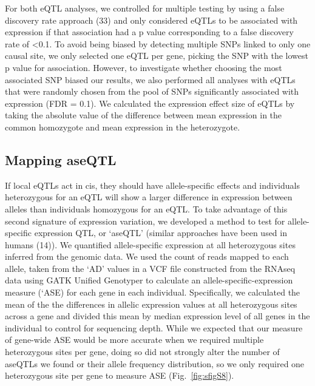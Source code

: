 For both eQTL analyses, we controlled for multiple testing by using a false discovery rate approach (33) and only considered eQTLs to be associated with expression if that association had a p value corresponding to a false discovery rate of <0.1. To avoid being biased by detecting multiple SNPs linked to only one causal site, we only selected one eQTL per gene, picking the SNP with the lowest p value for association. However, to investigate whether choosing the most associated SNP biased our results, we also performed all analyses with eQTLs that were randomly chosen from the pool of SNPs significantly associated with expression (FDR = 0.1). We calculated the expression effect size of eQTLs by taking the absolute value of the difference between mean expression in the common homozygote and mean expression in the heterozygote. 

\subsection{Mapping aseQTL}
If local eQTLs act in cis, they should have allele-specific effects and individuals heterozygous for an eQTL will show a larger difference in expression between alleles than individuals homozygous for an eQTL. To take advantage of this second signature of expression variation, we developed a method to test for allele-specific expression QTL, or ‘aseQTL’ (similar approaches have been used in humans (14)). We quantified allele-specific expression at all heterozygous sites inferred from the genomic data. We used the count of reads mapped to each allele, taken from the ‘AD’ values in a VCF file constructed from the RNAseq data using GATK Unified Genotyper to calculate an allele-specific-expression measure (‘ASE) for each gene in each individual. Specifically, we calculated the mean of the the differences in allelic expression values at all heterozygous sites across a gene and divided this mean by median expression level of all genes in the individual to control for sequencing depth. While we expected that our measure of gene-wide ASE would be more accurate when we required multiple heterozygous sites per gene, doing so did not strongly alter the number of aseQTLs we found or their allele frequency distribution, so we only required one heterozygous site per gene to measure ASE (Fig.~\ref{fig:sfigS8}).


